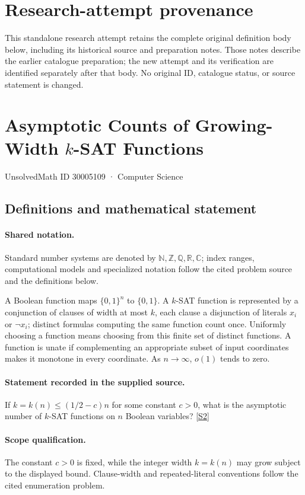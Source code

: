 \documentclass[11pt]{article}
\begin{document}
\section*{Research-attempt provenance}
This standalone research attempt retains the complete original definition body below,
including its historical source and preparation notes. Those notes describe the
earlier catalogue preparation; the new attempt and its verification are identified
separately after that body. No original ID, catalogue status, or source statement is changed.

\section{Asymptotic Counts of Growing-Width $k$-SAT Functions}\label{30005109}
{\small UnsolvedMath ID 30005109 · Computer Science}
\subsection{Definitions and mathematical statement}

\paragraph{Shared notation.}Standard number systems are denoted by $\mathbb N,\mathbb Z,\mathbb Q,\mathbb R,\mathbb C$; index ranges, computational models and specialized notation follow the cited problem source and the definitions below.


A Boolean function maps $\{0,1\}^n$ to $\{0,1\}$. A $k$-SAT function is represented by a conjunction of clauses of width at most $k$, each clause a disjunction of literals $x_i$ or $\neg x_i$; distinct formulas computing the same function count once. Uniformly choosing a function means choosing from this finite set of distinct functions. A function is unate if complementing an appropriate subset of input coordinates makes it monotone in every coordinate. As $n\to\infty$, $o(1)$ tends to zero.
\paragraph{Statement recorded in the supplied source.}
If $k=k(n)\leq(1/2-c)n$ for some constant $c>0$, what is the asymptotic number of $k$-SAT functions on $n$ Boolean variables? \href{https://doi.org/10.4171/owr/2022/22}{[S2]}
\paragraph{Scope qualification.}
The constant $c>0$ is fixed, while the integer width $k=k(n)$ may grow subject to the displayed bound. Clause-width and repeated-literal conventions follow the cited enumeration problem.
\end{document}
